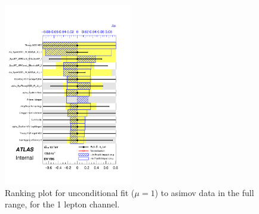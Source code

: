 \begin{figure}[ht]
      \centering
        \includegraphics[width=0.5\textwidth]{figures/Fit_np_rank/pulls_mu_Asimov/pulls_mu_SemileptonicVBS_5.pdf}
        \caption{Ranking plot for unconditional fit ($\mu=1$) to asimov data in the full range, for the 1 lepton channel.}
       \label{fig:fit_1lep_ranking_all}
\end{figure}

~
